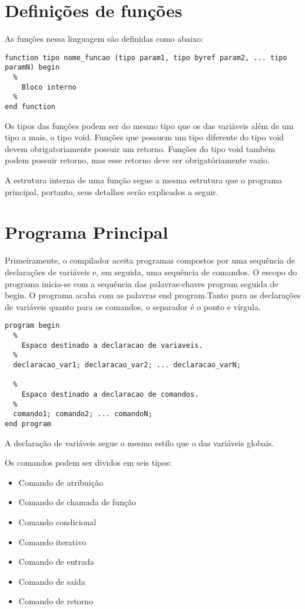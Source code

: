 \documentclass[12pt,oneside,a4paper,english]{abntex2}
\begin{document}
  \section{Definições de funções}

  As funções nessa linguagem são definidas como abaixo:

\begin{lstlisting}
function tipo nome_funcao (tipo param1, tipo byref param2, ... tipo paramN) begin
  %
    Bloco interno
  %
end function
\end{lstlisting}

  Os tipos das funções podem ser do mesmo tipo que os das variáveis além de um tipo a mais, o tipo void. Funções que possuem um tipo diferente do tipo void devem obrigatoriamente possuir um retorno. Funções do tipo void também podem possuir retorno, mas esse retorno deve ser obrigatóriamente vazio.

  A estrutura interna de uma função segue a mesma estrutura que o programa principal, portanto, seus detalhes serão explicados a seguir.

  \section{Programa Principal}

  Primeiramente, o compilador aceita programas compostos por uma sequência de declarações de variáveis e, em seguida, uma sequência de comandos. O escopo do programa inicia-se com a sequência das palavras-chaves program seguida de begin. O programa acaba com as palavras end program.Tanto para as declarações de variáveis quanto para os comandos, o separador é o ponto e vírgula. 

\begin{lstlisting} 
program begin
  %
    Espaco destinado a declaracao de variaveis.
  %
  declaracao_var1; declaracao_var2; ... declaracao_varN;

  %
    Espaco destinado a declaracao de comandos.
  %
  comando1; comando2; ... comandoN; 
end program
\end{lstlisting}
          
  A declaração de variáveis segue o mesmo estilo que o das variáveis globais.

  Os comandos podem ser dividos em seis tipos:
  \begin{itemize}
    \item Comando de atribuição
    \item Comando de chamada de função
    \item Comando condicional
    \item Comando iterativo
    \item Comando de entrada
    \item Comando de saída
    \item Comando de retorno
  \end{itemize}
\end{document}
